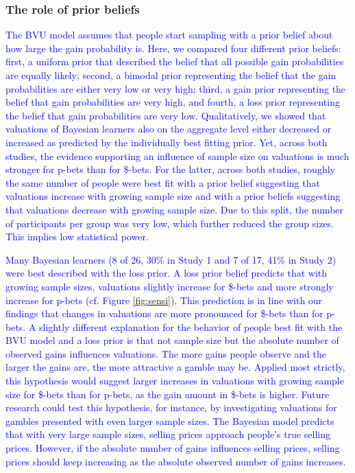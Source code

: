 \documentclass[a4paper, man, natbib, floatsintext]{apa6} %
\begin{document}
\subsubsection{The role of prior beliefs} 
\textcolor{blue}{The BVU model assumes that people start sampling with a prior belief about how large the gain probability is. Here, we compared four different prior beliefs: first, a uniform prior that described the belief that all possible gain probabilities are equally likely; second, a bimodal prior representing the belief that the gain probabilities are either very low or very high; third, a gain prior representing the belief that gain probabilities are very high, and fourth, a loss prior representing the belief that gain probabilities are very low. Qualitatively, we showed that valuations of Bayesian learners also on the aggregate level either decreased or increased as predicted by the individually best fitting prior. Yet, across both studies, the evidence supporting an influence of sample size on valuations is much stronger for p-bets than for \$-bets. For the latter, across both studies, roughly the same number of people were best fit with a prior belief suggesting that valuations increase with growing sample size and with a prior beliefs suggesting that valuations decrease with growing sample size. Due to this split, the number of participants per group was very low, which further reduced the group sizes. This implies low statistical power.}

\textcolor{blue}{
Many Bayesian learners (8 of 26, 30\% in Study 1 and 7 of 17, 41\% in Study 2) were best described with the loss prior. A loss prior belief predicts that with growing sample sizes, valuations slightly increase for \$-bets and more strongly increase for p-bets (cf. Figure \ref{fig:sensi}). This prediction is in line with our findings that changes in valuations are more pronounced for \$-bets than for p-bets. A slightly different explanation for the behavior of people best fit with the BVU model and a loss prior is that not sample size but the absolute number of observed gains influences valuations. The more gains people observe and the larger the gains are, the more attractive a gamble may be.  Applied most strictly, this hypothesis would suggest larger increases in valuations with growing sample size for \$-bets than for p-bets, as the gain amount in \$-bets is higher. Future research could test this hypothesis, for instance, by investigating valuations for gambles presented with even larger sample sizes. The Bayesian model predicts that with very large sample sizes, selling prices approach people's true selling prices. However, if the absolute number of gains influences selling prices, selling prices should keep increasing as the absolute observed number of gains increases.} %
\end{document}
